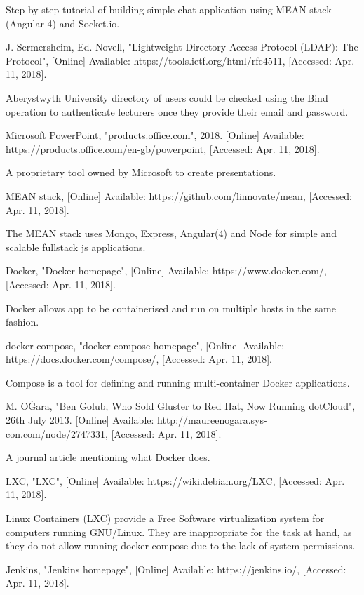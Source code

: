 \documentclass[11pt,a4paper]{report}
\begin{document}
\begin{thebibliography}{1}
  Step by step tutorial of building simple chat application using MEAN stack (Angular 4) and Socket.io.

 J. Sermersheim, Ed. Novell, "Lightweight Directory Access Protocol (LDAP): The Protocol", [Online]
    Available: https://tools.ietf.org/html/rfc4511, [Accessed: Apr. 11, 2018].

    Aberystwyth University directory of users could be checked using the Bind operation
    to authenticate lecturers once they provide their email and password.

 Microsoft PowerPoint, "products.office.com", 2018. [Online] Available: https://products.office.com/en-gb/powerpoint, [Accessed: Apr. 11, 2018].

  A proprietary tool owned by Microsoft to create presentations.

 MEAN stack, [Online] Available: https://github.com/linnovate/mean, [Accessed: Apr. 11, 2018].

    The MEAN stack uses Mongo, Express, Angular(4) and Node for simple and scalable fullstack js applications.

 Docker, "Docker homepage", [Online] Available: https://www.docker.com/, [Accessed: Apr. 11, 2018].

    Docker allows app to be containerised and run on multiple hosts in the same fashion.

 docker-compose, "docker-compose homepage", [Online] Available: https://docs.docker.com/compose/, [Accessed: Apr. 11, 2018].

    Compose is a tool for defining and running multi-container Docker applications.

  M. O\'Gara, "Ben Golub, Who Sold Gluster to Red Hat, Now Running dotCloud", 26th July 2013.
  [Online] Available: http://maureenogara.sys-con.com/node/2747331, [Accessed: Apr. 11, 2018].

  A journal article mentioning what Docker does.

 LXC, "LXC", [Online] Available: https://wiki.debian.org/LXC, [Accessed: Apr. 11, 2018].

  Linux Containers (LXC) provide a Free Software virtualization system for computers running GNU/Linux. They are inappropriate
  for the task at hand, as they do not allow running docker-compose due to the lack of system permissions.

 Jenkins, "Jenkins homepage", [Online] Available: https://jenkins.io/, [Accessed: Apr. 11, 2018].


\end{thebibliography}
\end{document}
